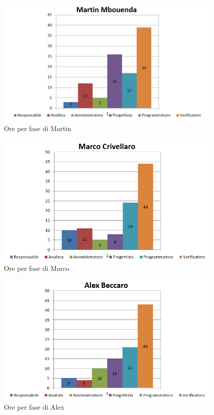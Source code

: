 \documentclass[a4paper,11pt]{article}
\begin{document}
	\begin{figure}[h!]
		\centering
		\includegraphics[scale=0.7]{../Images/ore_per_ruolo_Martin.png}
	\caption{ Ore per fase di Martin }
	\end{figure}
	\begin{figure}[h!]
		\centering
		\includegraphics[scale=0.7]{../Images/ore_per_ruolo_Marco.png}
	\caption{ Ore per fase di Marco }
	\end{figure}
	\begin{figure}[h!]
		\centering
		\includegraphics[scale=0.7]{../Images/ore_per_ruolo_Alex.png}
	\caption{ Ore per fase di Alex}
	\end{figure}
\end{document}
